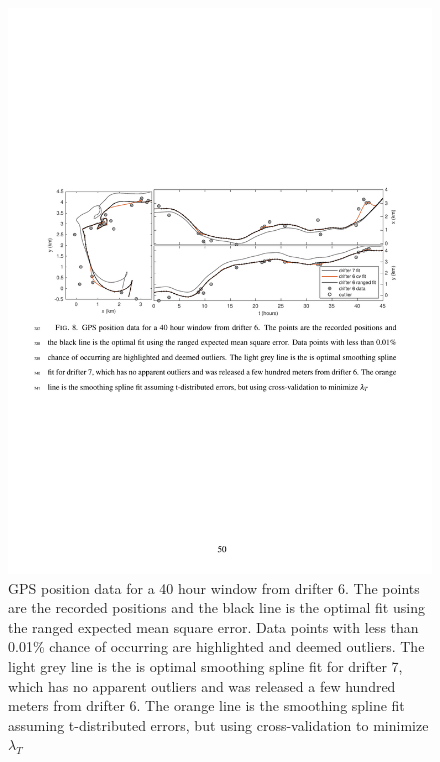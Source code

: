 \documentclass{ametsoc}
\begin{document}
\begin{figure}[t]
  \centering
   \includegraphics[width=1.0\textwidth]{gpsfit.pdf}
   \caption{GPS position data for a 40 hour window from drifter 6. The points are the recorded positions and the black line is the optimal fit using the ranged expected mean square error. Data points with less than 0.01\% chance of occurring are highlighted and deemed outliers. The light grey line is the is optimal smoothing spline fit for drifter 7, which has no apparent outliers and was released a few hundred meters from drifter 6. The orange line is the smoothing spline fit assuming t-distributed errors, but using cross-validation to minimize $\lambda_T$}
  \label{gpsfit}
\end{figure}
\end{document}
